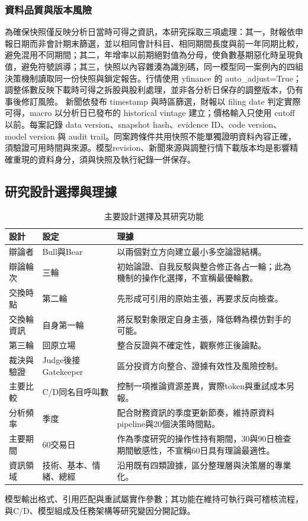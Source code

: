 \documentclass[12pt,a4paper]{article}
\begin{document}
\begin{CJK}{UTF8}{bkai}
\subsubsection{資料品質與版本風險}
為確保快照僅反映分析日當時可得之資訊，本研究採取三項處理：其一，財報依申報日期而非會計期末篩選，並以相同會計科目、相同期間長度與前一年同期比較，避免混用不同期間；其二，年增率以前期絕對值為分母，使負數基期惡化時呈現負值，避免符號誤導；其三，快照以內容雜湊為識別碼，同一模型同一案例內的四組決策機制讀取同一份快照與鎖定報告。行情使用 yfinance 的 auto\_adjust=True；調整係數反映下載時可得之拆股與股利處理，並非各分析日保存的調整版本，仍有事後修訂風險。
新聞依發布 timestamp 與時區篩選，財報以 filing date 判定實際可得，macro 以分析日已發布的 historical vintage 建立；價格輸入只使用 cutoff 以前。每案記錄 data version、snapshot hash、evidence ID、code version、model version 與 audit trail。同案跨條件共用快照不能單獨證明資料內容正確，須驗證可用時間與來源。模型revision、新聞來源與調整行情下載版本均是影響精確重現的資料身分，須與快照及執行紀錄一併保存。

\subsection{研究設計選擇與理據}
\begin{table}[H]\centering\small
\caption{主要設計選擇及其研究功能}
\begin{tabularx}{\textwidth}{@{}l l Y@{}}\toprule
設計 & 設定 & 理據\\\midrule
辯論者 & Bull與Bear & 以兩個對立方向建立最小多空論證結構。\\
辯論輪次 & 三輪 & 初始論證、自我反駁與整合修正各占一輪；此為機制的操作化選擇，不宣稱最優輪數。\\
交換時點 & 第二輪 & 先形成可引用的原始主張，再要求反向檢查。\\
交換輪資訊 & 自身第一輪 & 將反駁對象限定自身主張，降低轉為模仿對手的可能。\\
第三輪 & 回原立場 & 整合反證與不確定性，觀察修正後論點。\\
裁決與驗證 & Judge後接Gatekeeper & 區分投資方向整合、證據有效性及風險控制。\\
主要比較 & C/D同名目呼叫數 & 控制一項推論資源差異，實際token與重試成本另報。\\
分析頻率 & 季度 & 配合財務資訊的季度更新節奏，維持原資料pipeline與20個決策時間點。\\
主要期間 & 60交易日 & 作為季度研究的操作性持有期間，30與90日檢查期間敏感性，不宣稱60日具有理論最適性。\\
資訊領域 & 技術、基本、情緒、總經 & 沿用既有四類證據，區分整理層與決策層的專業化。\\\bottomrule
\end{tabularx}\end{table}
模型輸出格式、引用匹配與重試屬實作參數；其功能在維持可執行與可稽核流程，與C/D、模型組成及任務架構等研究變因分開記錄。


\end{CJK}
\end{document}
